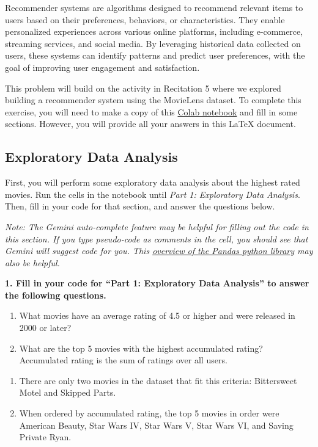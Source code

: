 \documentclass{article}
\begin{document}
Recommender systems are algorithms designed to recommend relevant items to users based on their preferences, behaviors, or characteristics. They enable personalized experiences across various online platforms, including e-commerce, streaming services, and social media. By leveraging historical data collected on users, these systems can identify patterns and predict user preferences, with the goal of improving user engagement and satisfaction. 

This problem will build on the activity in Recitation 5 where we explored building a recommender system using the MovieLens dataset. To complete this exercise, you will need to make a copy of this \href{https://colab.research.google.com/drive/1cePNNiv2fVCfrrQGHov4kUJZDmViH5M8?usp=sharing}{Colab notebook} and fill in some sections. However, you will provide all your answers in this LaTeX document. 


\subsection*{Exploratory Data Analysis}

First, you will perform some exploratory data analysis about the highest rated movies. Run the cells in the notebook until \textit{Part 1: Exploratory Data Analysis}. Then, fill in your code for that section, and answer the questions below.

\textit{Note: The Gemini auto-complete feature may be helpful for filling out the code in this section. If you type pseudo-code as comments in the cell, you should see that Gemini will suggest code for you. This \href{https://pandas.pydata.org/docs/user_guide/10min.html}{overview of the Pandas python library} may also be helpful.} 

\textbf{1. Fill in your code for ``Part 1: Exploratory Data Analysis'' to answer the following questions.}
\begin{enumerate}[label=\Alph*.]
\item What movies have an average rating of 4.5 or higher and were released in 2000 or later?
\item What are the top 5 movies with the highest accumulated rating? Accumulated rating is the sum of ratings over all users.
\end{enumerate}

\bigskip

\begin{mdframed}
\begin{enumerate}[label=\Alph*.]
\item There are only two movies in the dataset that fit this criteria: Bittersweet Motel and Skipped Parts.
\item When ordered by accumulated rating, the top 5 movies in order were American Beauty, Star Wars IV, Star Wars V, Star Wars VI, and Saving Private Ryan.
\end{enumerate}
\end{mdframed}
\end{document}
